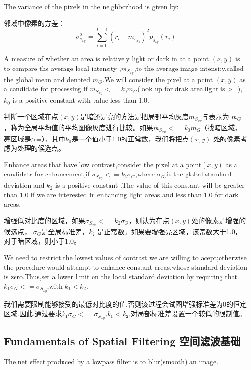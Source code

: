 \documentclass[a4paper,12pt]{article}
\numberwithin{equation}{section}%
\begin{document}
The variance of the pixels in the neighborhood is given by:

邻域中像素的方差：
\begin{equation} \label {3.23}
\sigma^{2}_{s_{xy}}=\sum_{i=0}^{L-1}(r_{i}-m_{s_{xy}})^{2}p_{s_{xy}}(r_{i})
\end{equation}

A measure of whether an area is relatively light or dark in at  a point $(x,y)$ is to compare the average local intensity ,$m_{S_{xy}}$,to the average image intensity,called the global mean and denoted $m_{G}$.We will consider the pixel at a point $(x,y)$ as a candidate for processing if $m_{S_{xy}}<=k_{0}m_{G}$(look up for drak area,light is >=),$k_{0}$ is a positive constant with value less than 1.0.

判断一个区域在点$(x,y)$是暗还是亮的方法是把局部平均灰度$m_{S_{xy}}$与表示为 $m_{G}$，称为全局平均值的平均图像灰度进行比较。如果$m_{S_{xy}}<=k_{0}m_{G}$（找暗区域，亮区域是>=），其中$k_{0}$是一个值小于1.0的正常数，我们将把点$(x,y)$ 处的像素考虑为处理的候选点。

Enhance areas that have low contrast,consider the pixel at a point$(x,y)$ as a candidate for enhancement,if $ \sigma_{S_{xy}}<=k_{2}\sigma_{G}$,where $\sigma_{G}$,is the global standard deviation and $k_{2}$ is a positive constant .The value of this constant will be greater than 1.0 if we are interested in enhancing light areas and less than 1.0 for dark areas.

增强低对比度的区域，如果$ \sigma_{S_{xy}}<=k_{2}\sigma_{G}$，则认为在点$(x,y)$处的像素是增强的候选点， $\sigma_{G}$是全局标准差，$k_{2}$ 是正常数。如果要增强亮区域，该常数大于1.0，对于暗区域，则小于1.0。

We need to restrict the lowest values of contrast we are willing to acept;otherwise the procedure would attempt to enhance constant areas,whose standard deviation is zero.Thus,set a lower limit on the local standard deviation by requiring that $k_{1}\sigma_{G}<=\sigma_{S_{xy}}$,with $k_{1}<k_{2}$.

我们需要限制能够接受的最低对比度的值,否则该过程会试图增强标准差为0的恒定区域.因此,通过要求$k_{1}\sigma_{G}<=\sigma_{S_{xy}}$,$k_{1}<k_{2}$,对局部标准差设置一个较低的限制值。

\subsection{Fundamentals of Spatial Filtering 空间滤波基础}

The net effect produced by a lowpass filter is to blur(smooth)  an image.
\end{document}
